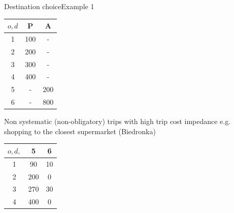 \documentclass[8pt]{beamer}
\begin{document}
\begin{frame}{Destination choice}{Example 1}
\begin{center}
\begin{minipage}{0.65\textwidth}
        
    \end{minipage}\hfill
    \begin{minipage}{0.25\textwidth}
     \begin{center}
\begin{tabular}{|c|c|c|}
\hline 
{$o,d$} & P & A \\ 
\hline 
1 & 100 & -  \\ 
\hline 
2 & 200 & -  \\ 
\hline 
3 & 300 & -  \\ 
\hline 
4 & 400 & -    \\ 
\hline 
5 & - & 200  \\ 
\hline 
6 & - & 800  \\ 
\hline
\end{tabular}
\end{center}   
    \end{minipage}
\end{center}
\begin{block}{Non systematic (non-obligatory) trips with high trip cost impedance} 
e.g. shopping to the closest supermarket (Biedronka)
\end{block}
\begin{center}
\begin{tabular}{|c|c|c|}
\hline 
{$o,d,$}& 5 & 6 \\ 
\hline 
1 & 90 & 10  \\ 
\hline 
2 & 200 & 0 \\ 
\hline 
3 & 270 & 30 \\ 
\hline 
4 & 400 & 0 \\ 
\hline 
\end{tabular} 
\end{center}
\end{frame}
\end{document}
